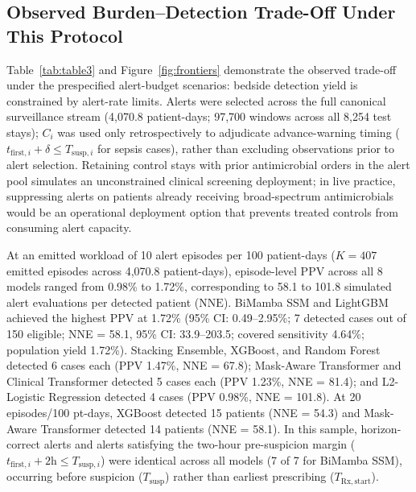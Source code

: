 \documentclass[10pt,twocolumn,a4paper]{article}
\begin{document}
\subsection{Observed Burden--Detection Trade-Off Under This Protocol}
Table~\ref{tab:table3} and Figure~\ref{fig:frontiers} demonstrate the observed trade-off under the prespecified alert-budget scenarios: bedside detection yield is constrained by alert-rate limits. Alerts were selected across the full canonical surveillance stream (4,070.8 patient-days; 97,700 windows across all 8,254 test stays); $C_i$ was used only retrospectively to adjudicate advance-warning timing ($t_{\mathrm{first}, i} + \delta \le T_{\mathrm{susp}, i}$ for sepsis cases), rather than excluding observations prior to alert selection. Retaining control stays with prior antimicrobial orders in the alert pool simulates an unconstrained clinical screening deployment; in live practice, suppressing alerts on patients already receiving broad-spectrum antimicrobials would be an operational deployment option that prevents treated controls from consuming alert capacity.

At an emitted workload of 10 alert episodes per 100 patient-days ($K=407$ emitted episodes across 4,070.8 patient-days), episode-level PPV across all 8 models ranged from 0.98\% to 1.72\%, corresponding to 58.1 to 101.8 simulated alert evaluations per detected patient ($\text{NNE}$). BiMamba SSM and LightGBM achieved the highest PPV at 1.72\% (95\% CI: 0.49--2.95\%; 7 detected cases out of 150 eligible; NNE = 58.1, 95\% CI: 33.9--203.5; covered sensitivity 4.64\%; population yield 1.72\%). Stacking Ensemble, XGBoost, and Random Forest detected 6 cases each (PPV 1.47\%, NNE = 67.8); Mask-Aware Transformer and Clinical Transformer detected 5 cases each (PPV 1.23\%, NNE = 81.4); and L2-Logistic Regression detected 4 cases (PPV 0.98\%, NNE = 101.8). At 20 episodes/100 pt-days, XGBoost detected 15 patients (NNE = 54.3) and Mask-Aware Transformer detected 14 patients (NNE = 58.1). In this sample, horizon-correct alerts and alerts satisfying the two-hour pre-suspicion margin ($t_{\mathrm{first}, i} + 2\text{h} \le T_{\mathrm{susp}, i}$) were identical across all models (7 of 7 for BiMamba SSM), occurring before suspicion ($T_{\mathrm{susp}}$) rather than earliest prescribing ($T_{\mathrm{Rx,start}}$).
\end{document}

